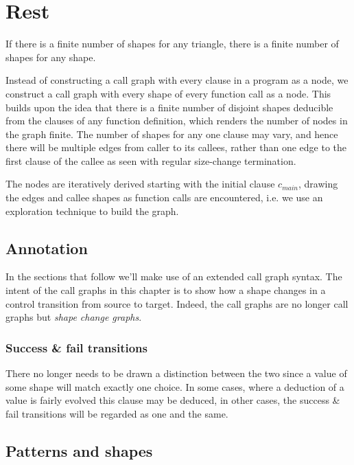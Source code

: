 \section{Rest}

If there is a finite number of shapes for any triangle, there is a finite number of shapes for any shape.

Instead of constructing a call graph with every clause in a program as a node,
we construct a call graph with every shape of every function call as a node.
This builds upon the idea that there is a finite number of disjoint shapes
deducible from the clauses of any function definition, which renders the number
of nodes in the graph finite. The number of shapes for any one clause may vary,
and hence there will be multiple edges from caller to its callees, rather than
one edge to the first clause of the callee as seen with regular size-change
termination.

The nodes are iteratively derived starting with the initial clause $c_{main}$,
drawing the edges and callee shapes as function calls are encountered, i.e. we
use an exploration technique to build the graph.

\subsection{Annotation}

In the sections that follow we'll make use of an extended call graph syntax.
The intent of the call graphs in this chapter is to show how a shape changes in
a control transition from source to target. Indeed, the call graphs are no
longer call graphs but \emph{shape change graphs}.

\subsubsection{Success \& fail transitions}

There no longer needs to be drawn a distinction between the two since a value
of some shape will match exactly one choice. In some cases, where a deduction
of a value is fairly evolved this clause may be deduced, in other cases, the
success \& fail transitions will be regarded as one and the same. 

\subsection{Patterns and shapes}


